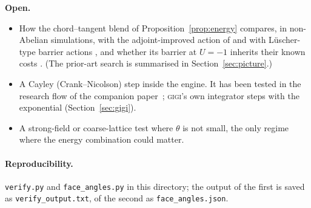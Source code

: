 \documentclass[11pt]{article}
\begin{document}
\textbf{Open.}
\begin{itemize}
  \item How the chord--tangent blend of Proposition~\ref{prop:energy} compares, in non-Abelian
    simulations, with the adjoint-improved action of \cite{deforcrand} and with L\"uscher-type
    barrier actions \cite{luscher,fukaya}, and whether its barrier at $U=-1$ inherits their known
    costs \cite{creutz}. (The prior-art search is summarised in Section~\ref{sec:picture}.)
  \item A Cayley (Crank--Nicolson) step inside the engine. It has been tested in the research
    flow of the companion paper~\cite{davis-rtc}; \textsc{gigi}'s own integrator steps with
    the exponential (Section~\ref{sec:gigi}).
  \item A strong-field or coarse-lattice test where $\theta$ is not small, the only regime
    where the energy combination could matter.
\end{itemize}

\paragraph{Reproducibility.} \texttt{verify.py} and \texttt{face\_angles.py} in this
directory; the output of the first is saved as \texttt{verify\_output.txt}, of the second as
\texttt{face\_angles.json}.
\end{document}
